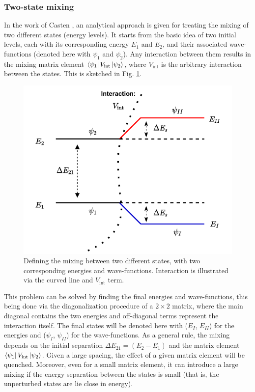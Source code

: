 \subsubsection{Two-state mixing}

In the work of Casten \cite{casten2000nuclear}, an analytical approach is given for treating the mixing of two different states (energy levels). It starts from the basic idea of two initial levels, each with its corresponding energy $E_1$ and $E_2$, and their associated wave-functions (denoted here with $\psi_1$ and $\psi_2$). Any interaction between them results in the mixing matrix element $\bra{\psi_1}V_\text{int}\ket{\psi_2}$, where $V_\text{int}$ is the arbitrary interaction between the states. This is sketched in Fig. \ref{two-state-mixing-scheme}.

\begin{figure}
    \centering
    \includegraphics[scale=0.95]{Chapters/Figures/two-state-mixing.pdf}
    \caption{Defining the mixing between two different states, with two corresponding energies and wave-functions. Interaction is illustrated via the curved line and $V_\text{int}$ term.}
    \label{two-state-mixing-scheme}
\end{figure}

This problem can be solved by finding the final energies and wave-functions, this being done via the diagonalization procedure of a $2\times 2$ matrix, where the main diagonal contains the two energies and off-diagonal terms represent the interaction itself. The final states will be denoted here with ($E_I$, $E_{II}$) for the energies and ($\psi_I$, $\psi_{II}$) for the wave-functions. As a general rule, the mixing depends on the initial separation $\Delta E_{21}=(E_2-E_1)$ and the matrix element $\bra{\psi_1}V_\text{int}\ket{\psi_2}$. Given a large spacing, the effect of a given matrix element will be quenched. Moreover, even for a small matrix element, it can introduce a large mixing if the energy separation between the states is small (that is, the unperturbed states are lie close in energy). 

